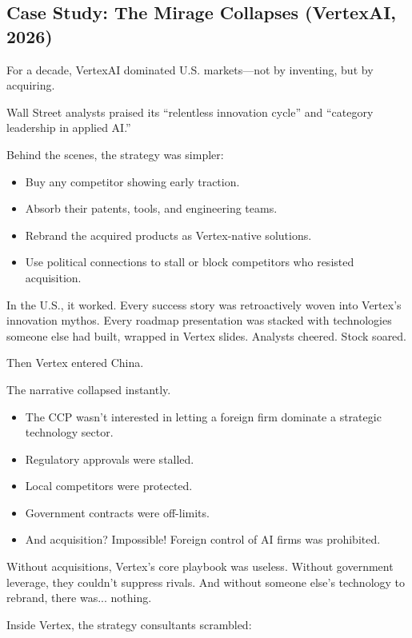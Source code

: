 \subsection{Case Study: The Mirage Collapses (VertexAI, 2026)}

For a decade, VertexAI dominated U.S. markets—not by inventing, but by acquiring.

Wall Street analysts praised its “relentless innovation cycle” and “category leadership in applied AI.”  

Behind the scenes, the strategy was simpler:  

\begin{itemize}
  \item Buy any competitor showing early traction.
  \item Absorb their patents, tools, and engineering teams.
  \item Rebrand the acquired products as Vertex-native solutions.
  \item Use political connections to stall or block competitors who resisted acquisition.
\end{itemize}

In the U.S., it worked.  Every success story was retroactively woven into Vertex’s innovation mythos.  Every roadmap presentation was stacked with technologies someone else had built, wrapped in Vertex slides.  Analysts cheered.  Stock soared.

Then Vertex entered China.

The narrative collapsed instantly.

\begin{itemize}
  \item The CCP wasn’t interested in letting a foreign firm dominate a strategic technology sector.  
  \item Regulatory approvals were stalled.  
  \item Local competitors were protected.  
  \item Government contracts were off-limits.  
  \item And acquisition? Impossible! Foreign control of AI firms was prohibited.
\end{itemize}

Without acquisitions, Vertex’s core playbook was useless. Without government leverage, they couldn’t suppress rivals.  And without someone else’s technology to rebrand, there was... nothing.

Inside Vertex, the strategy consultants scrambled:

